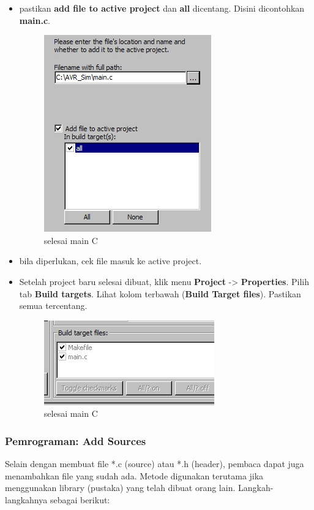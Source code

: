 \documentclass[12pt,]{article}
\begin{document}
\begin{itemize}
		\item pastikan \textbf{add file to active project} dan \textbf{all} dicentang.
		Disini dicontohkan \textbf{main.c}.
		\begin{figure}[H]
			\centering
			\includegraphics[width=0.5\linewidth]{images/hello_a13}
			\caption{selesai main C}
		\end{figure}
		
		\item bila diperlukan, cek file masuk ke active project.
		\item Setelah project baru selesai dibuat, klik menu \textbf{Project} -> \textbf{Properties}.
		Pilih tab \textbf{Build targets}.
		Lihat kolom terbawah (\textbf{Build Target files}).
		Pastikan semua tercentang.
		\begin{figure}[H]
			\centering
			\includegraphics[width=0.5\linewidth]{images/hello_a14}
			\caption{selesai main C}
		\end{figure}
		
	\end{itemize}

	\newpage
	\subsubsection{Pemrograman: Add Sources}
	
	Selain dengan membuat file *.c (source) atau *.h (header), pembaca dapat juga menambahkan file yang sudah ada.
	Metode digunakan terutama jika menggunakan library (pustaka) yang telah dibuat orang lain.
	Langkah-langkahnya sebagai berikut:
	
\end{document}

